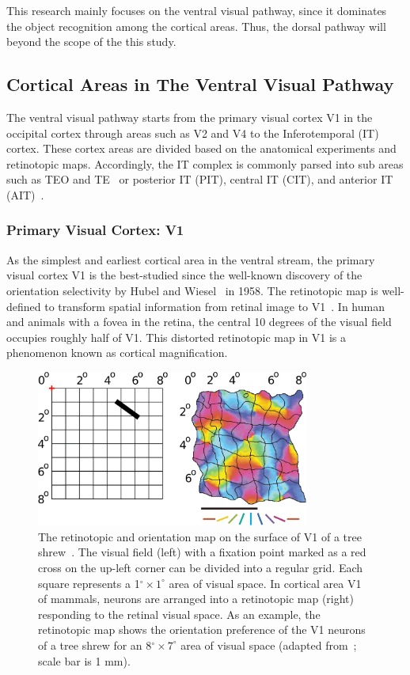 This research mainly focuses on the ventral visual pathway, since it dominates the object recognition among the cortical areas.
Thus, the dorsal pathway will beyond the scope of the this study. 


\subsection{Cortical Areas in The Ventral Visual Pathway}
The ventral visual pathway starts from the primary visual cortex V1 in the occipital cortex through areas such as V2 and V4 to the Inferotemporal (IT) cortex.
These cortex areas are divided based on the anatomical experiments and retinotopic maps.
Accordingly, the IT complex is commonly parsed into sub areas such as TEO and TE~\cite{janssen2000selectivity,von1947neocortex} or posterior IT (PIT), central IT (CIT), and anterior IT (AIT)~\cite{felleman1991distributed}.
\subsubsection{Primary Visual Cortex: V1}
As the simplest and earliest cortical area in the ventral stream, the primary visual cortex V1 is the best-studied since the well-known discovery of the orientation selectivity by Hubel and Wiesel~\cite{hubel1959receptive} in 1958.
The retinotopic map is well-defined to transform spatial information from retinal image to V1~\cite{tootell1982deoxyglucose}.
In human and animals with a fovea in the retina, the central 10 degrees of the visual field occupies roughly half of V1.
This distorted retinotopic map in V1 is a phenomenon known as cortical magnification.

\begin{figure}
	\centering
	\includegraphics[width=0.8\textwidth]{pics/retinotopic.jpg}
	\caption{The retinotopic and orientation map on the surface of V1 of a tree shrew~\cite{bednar2009topographica}.
	The visual field (left) with a fixation point marked as a red cross on the up-left corner can be divided into a regular grid.
	Each square represents a 1$^\circ \times 1^\circ$ area of visual space.
	In cortical area V1 of mammals, neurons are arranged into a retinotopic map (right) responding to the retinal visual space.
	As an example, the retinotopic map shows the orientation preference of the V1 neurons of a tree shrew for an 8$^\circ \times 7^\circ$ area of visual space (adapted from~\cite{bosking2002spatial}; scale bar is 1 mm).}
	\label{Fig:retinotopic}
\end{figure}

